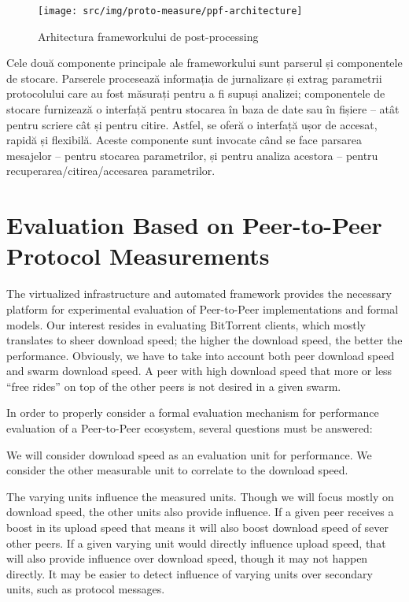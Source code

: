 \begin{figure}[h]
  \begin{center}
    \texttt{[image: src/img/proto-measure/ppf-architecture]}
  \end{center}
  \caption{Arhitectura frameworkului de post-processing}
  \label{fig:proto-measure:ppf-architecture}
\end{figure}

Cele două componente principale ale frameworkului sunt parserul și componentele
de stocare. Parserele procesează informația de jurnalizare și extrag parametrii
protocolului care au fost măsurați pentru a fi supuși analizei; componentele
de stocare furnizează o interfață pentru stocarea în baza de date sau în fișiere
-- atât pentru scriere cât și pentru citire. Astfel, se oferă o interfață
ușor de accesat, rapidă și flexibilă. Aceste componente sunt invocate când
se face parsarea mesajelor -- pentru stocarea parametrilor, și pentru
analiza acestora -- pentru recuperarea/citirea/accesarea parametrilor.

\section{Evaluation Based on Peer-to-Peer Protocol Measurements}
\label{sec:proto-measure:eval-swarm}

The virtualized infrastructure and automated framework provides the necessary
platform for experimental evaluation of Peer-to-Peer implementations and
formal models. Our interest resides in evaluating BitTorrent clients, which
mostly translates to sheer download speed; the higher the download speed, the
better the performance. Obviously, we have to take into account both peer
download speed and swarm download speed. A peer with high download speed that
more or less ``free rides'' on top of the other peers is not desired in a
given swarm.

In order to properly consider a formal evaluation mechanism for performance
evaluation of a Peer-to-Peer ecosystem, several questions must be answered:

We will consider download speed
as an evaluation unit for performance. We consider the other measurable unit
to correlate to the download speed.

The varying units influence the measured units. Though we will focus mostly on
download speed, the other units also provide influence. If a given peer
receives a boost in its upload speed that means it will also boost download
speed of sever other peers. If a given varying unit would directly influence
upload speed, that will also provide influence over download speed, though it
may not happen directly. It may be easier to detect influence of varying units
over secondary units, such as protocol messages.

